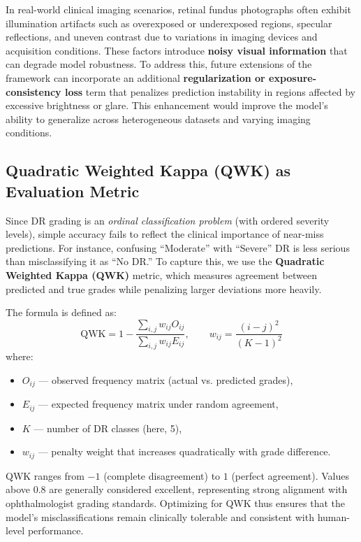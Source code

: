 \documentclass[12pt,a4paper]{article}
\begin{document}
In real-world clinical imaging scenarios, retinal fundus photographs often exhibit illumination artifacts such as overexposed or underexposed regions, specular reflections, and uneven contrast due to variations in imaging devices and acquisition conditions.  
These factors introduce \textbf{noisy visual information} that can degrade model robustness.  
To address this, future extensions of the framework can incorporate an additional \textbf{regularization or exposure-consistency loss} term that penalizes prediction instability in regions affected by excessive brightness or glare.  
This enhancement would improve the model’s ability to generalize across heterogeneous datasets and varying imaging conditions.


\subsection{Quadratic Weighted Kappa (QWK) as Evaluation Metric}
Since DR grading is an \textit{ordinal classification problem} (with ordered severity levels), simple accuracy fails to reflect the clinical importance of near-miss predictions.  
For instance, confusing “Moderate” with “Severe” DR is less serious than misclassifying it as “No DR.”  
To capture this, we use the \textbf{Quadratic Weighted Kappa (QWK)} metric, which measures agreement between predicted and true grades while penalizing larger deviations more heavily.

The formula is defined as:
\begin{equation}
\text{QWK} = 1 - \frac{\sum_{i,j} w_{ij} O_{ij}}{\sum_{i,j} w_{ij} E_{ij}}, \qquad
w_{ij} = \frac{(i-j)^2}{(K-1)^2}
\end{equation}
where:
\begin{itemize}[noitemsep, topsep=0pt]
    \item $O_{ij}$ — observed frequency matrix (actual vs. predicted grades),
    \item $E_{ij}$ — expected frequency matrix under random agreement,
    \item $K$ — number of DR classes (here, 5),
    \item $w_{ij}$ — penalty weight that increases quadratically with grade difference.
\end{itemize}

QWK ranges from $-1$ (complete disagreement) to $1$ (perfect agreement).  
Values above $0.8$ are generally considered excellent, representing strong alignment with ophthalmologist grading standards.  
Optimizing for QWK thus ensures that the model’s misclassifications remain clinically tolerable and consistent with human-level performance.
\end{document}
